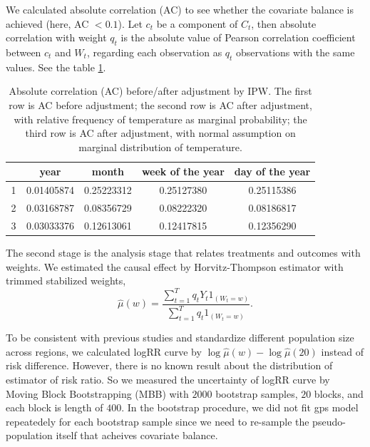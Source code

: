 \documentclass[12pt]{article}
\begin{document}
We calculated absolute correlation (AC)\cite{gpsboosting2015} 
to see whether the covariate balance is achieved (here, AC $<0.1$).
Let $c_t$ be a component of $C_t$, then absolute correlation with weight $q_t$ is
the absolute value of Pearson correlation coefficient between $c_t$ and $W_t$,
regarding each observation as $q_t$ observations with the same values.
See the table \ref{table:AC}.

\begin{table}[ht]
	\centering
\begin{tabular}{|| c || c | c | c | c || }
	\hline\hline
	\ & year & month & week of the year & day of the year \\
	\hline
	1 & 0.01405874 & 0.25223312 & 0.25127380 & 0.25115386 \\ %
	\hline
	2 & 0.03168787 & 0.08356729 & 0.08222320 & 0.08186817 \\ %
	\hline
	3 & 0.03033376 & 0.12613061 & 0.12417815 & 0.12356290 \\ %
	\hline\hline
	
\end{tabular}
\caption{
	Absolute correlation (AC) before/after adjustment by IPW.
	The first row is AC before adjustment;
	the second row is AC after adjustment, 
	with relative frequency of temperature as marginal probability;
	the third row is AC after adjustment, 
	with normal assumption on marginal distribution of temperature.}
\label{table:AC}
\end{table}

The second stage is the analysis stage that relates treatments and outcomes with weights.
We estimated the causal effect by Horvitz-Thompson estimator with trimmed stabilized weights,
\[
	\hat{\mu}(w) = \frac{\sum_{t = 1}^T q_t Y_t 1_{(W_t = w)}}{\sum_{t = 1}^T q_t 1_{(W_t = w)}}.
\]

To be consistent with previous studies and standardize different population size across regions,
we calculated logRR curve by $\log\hat{\mu}(w) - \log \hat{\mu}(20)$ instead of risk difference.
However, there is no known result about the distribution of estimator of risk ratio.
So we measured the uncertainty of logRR curve by Moving Block Bootstrapping (MBB)\cite{mbb1989}
with $2000$ bootstrap samples, $20$ blocks, and each block is length of $400$.
In the bootstrap procedure, we did not fit gps model repeatedely for each bootstrap sample
since we need to re-sample the pseudo-population itself that acheives covariate balance.
\end{document}
